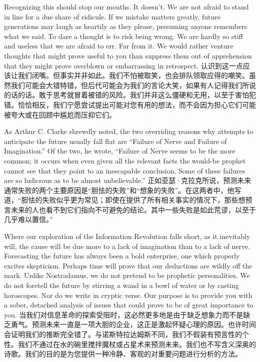 \begin{Parallel}{97mm}{45mm}
  \ParallelLText
  {Recognizing this should stop our mouths. It doesn't. We are not afraid to stand in line for a due share of ridicule. If we mistake matters greatly, future generations may laugh as heartily as they please, presuming anyone remembers what we said. To dare a thought is to risk being wrong. We are hardly so stiff and useless that we are afraid to err. Far from it. We would rather venture thoughts that might prove useful to you than suppress them out of apprehension that they might prove overblown or embarrassing in retrospect.  }  
  \ParallelRText
  {\small 认识到这一点应该让我们闭嘴。但事实并非如此。我们不怕被取笑，也会排队领取应得的嘲笑。虽然我们可能会大错特错，但后代可能会为我们的言论大笑，如果有人记得我们所说的话的话。敢于思考就冒着被错的风险。我们并非这么僵硬和无用，以至于害怕犯错。恰恰相反，我们宁愿尝试提出可能对您有用的想法，而不会因为担心它们可能被夸大或在回顾中尴尬而压抑它们。}
  \ParallelPar


  \ParallelLText
  {As Arthur C. Clarke shrewdly noted, the two overriding reasons why attempts to anticipate the future usually fall flat are “Failure of Nerve and Failure of Imagination.” Of the two, he wrote, “Failure of Nerve seems to be the more common; it occurs when even given all the relevant facts the would-be prophet cannot see that they point to an inescapable conclusion. Some of these failures are so ludicrous as to be almost unbelievable.”}  
  \ParallelRText
  {\small 正如亚瑟·克拉克所说，预测未来通常失败的两个主要原因是“胆怯的失败”和“想象的失败”。在这两者中，他写道，“胆怯的失败似乎更为常见；即使在提供了所有相关事实的情况下，那些想预言未来的人也看不到它们指向不可避免的结论。其中一些失败是如此荒谬，以至于几乎难以置信。”}
  \ParallelPar


  \ParallelLText
  {Where our exploration of the Information Revolution falls short, as it inevitably will, the cause will be due more to a lack of imagination than to a lack of nerve. Forecasting the future has always been a bold enterprise, one which properly excites skepticism. Perhaps time will prove that our deductions are wildly off the mark. Unlike Nostradamus, we do not pretend to be prophetic personalities. We do not foretell the future by stirring a wand in a bowl of water or by casting horoscopes. Nor do we write in cryptic verse. Our purpose is to provide you with a sober, detached analysis of issues that could prove to be of great importance to you.   }  
  \ParallelRText
  {\small 当我们对信息革命的探索受阻时，这必然更多地是由于缺乏想象力而不是缺乏勇气。预测未来一直是一项大胆的企业，这正是激起怀疑心理的原因。也许时间会证明我们的推断完全错了。与诺斯特拉达姆斯不同，我们不假装有预言性的个性。我们不通过在水的碗里搅拌魔杖或占星术来预测未来。我们也不写含义深奥的诗歌。我们的目的是为您提供一种冷静、客观的对重要问题进行分析的方法。}
  \ParallelPar



\end{Parallel}
